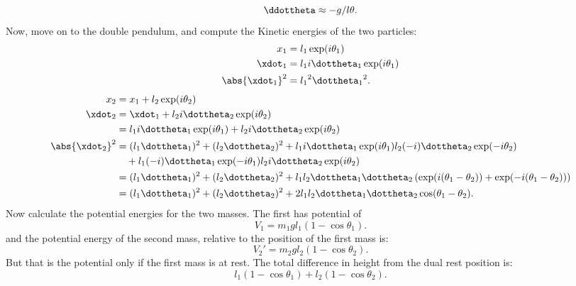 {\begin{equation}
\ddottheta \approx - g/l \theta.
\end{equation}
%
Now, move on to the double pendulum, and compute the Kinetic energies of the two particles:
%
\begin{equation}\label{eqn:tongMf1:400}
\begin{aligned}
x_1 &= l_1 \exp(i\theta_1) \\
\xdot_1 &= l_1 i \dottheta_1 \exp(i\theta_1) \\
\abs{\xdot_1}^2 &= {l_1}^2 {\dottheta_1}^2 .
\end{aligned}
\end{equation}
%
\begin{equation}\label{eqn:tongMf1:420}
\begin{aligned}
x_2 &= x_1 + l_2 \exp(i\theta_2) \\
\xdot_2 &= \xdot_1 + l_2 i \dottheta_2 \exp(i\theta_2) \\
        &= l_1 i \dottheta_1 \exp(i\theta_1) + l_2 i \dottheta_2 \exp(i\theta_2) \\
\abs{\xdot_2}^2
&=
(l_1 \dottheta_1)^2 + (l_2 \dottheta_2)^2
+ l_1 i \dottheta_1 \exp(i\theta_1) l_2 (-i) \dottheta_2 \exp(-i\theta_2) \\
&\quad
+ l_1 (-i) \dottheta_1 \exp(-i\theta_1) l_2 i \dottheta_2 \exp(i\theta_2) \\
&=
(l_1 \dottheta_1)^2 + (l_2 \dottheta_2)^2
+ l_1 l_2 \dottheta_1 \dottheta_2 \left( \exp(i(\theta_1 -\theta_2)) + \exp(-i(\theta_1 - \theta_2)) \right) \\
&=
(l_1 \dottheta_1)^2 + (l_2 \dottheta_2)^2
+ 2 l_1 l_2 \dottheta_1 \dottheta_2 \cos(\theta_1 -\theta_2) .
\end{aligned}
\end{equation}
%
Now calculate the potential energies for the two masses.  The first has potential of
%
\begin{equation}\label{eqn:tongMf1:1400}
V_1 = m_1 g l_1 (1 - \cos\theta_1).
\end{equation}
%
and the potential energy of the second mass, relative to the position of the first mass is:
\begin{equation}\label{eqn:tongMf1:1420}
V_2' = m_2 g l_2 (1 - \cos\theta_2).
\end{equation}
%
But that is the potential only if the first mass is at rest.  The total difference in height from the dual rest position is:
\begin{equation}\label{eqn:tongMf1:1440}
l_1 (1 - \cos\theta_1) + l_2 (1 - \cos\theta_2).
\end{equation}
}

